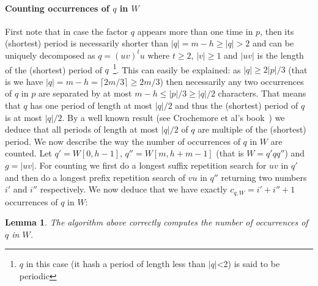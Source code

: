\documentclass{article}
\newcommand{\?}{\mskip1.5mu}
\newtheorem{lemma}{Lemma}
\begin{document}
\paragraph{Counting occurrences of $q$ in $W$}
First note that in case the factor $q$ appears more than one time in $p$, then its (shortest) period is necessarily shorter than $|q|=m-h\geq |q|>2$   and can be uniquely decomposed as $q=(uv)^tu$ where $t\geq 2$, $|v|\geq 1$ and $|uv|$ is the length of the (shortest) period of $q$~\footnote{$q$ in this case (it hash a period of length less than $|q|$<2) is said to be periodic}. This can easily be explained: as $|q|\geq 2|p|/3$ (that is we have $|q|=m-h=\lceil 2m/3\rceil\geq 2m/3$) then necessarily any two occurrences of $q$ in $p$ are separated by at most $m-h\leq |p|/3\geq |q|/2$ characters. That means that $q$  has one period of length at most $|q|/2$ and thus the (shortest) period of $q$ is at most $|q|/2$. By a well known result (see Crochemore et al's book~\cite[Lemma 1.6]{CHL07}) we deduce that all periods of length at most $|q|/2$ of $q$ are multiple of the (shortest) period.
We now describe the way the number of occurrences of $q$ in $W$ are counted. Let $q'=W[0,h-1]$, $q''=W[m,h+m-1]$ (that is $W=q'qq''$) and $g=|uv|$. For counting we first do a longest suffix repetition search for $uv$ in $q'$ and then do a longest prefix repetition search of $vu$ in $q''$ returning two numbers $i'$ and $i''$ respectively. We now deduce that we have exactly $c_{q,W}=i'+i''+1$ occurrences of $q$ in $W$:
\begin{lemma}
The algorithm above correctly computes the number of occurrences of $q$ in $W$. 
\end{lemma}
\end{document}
